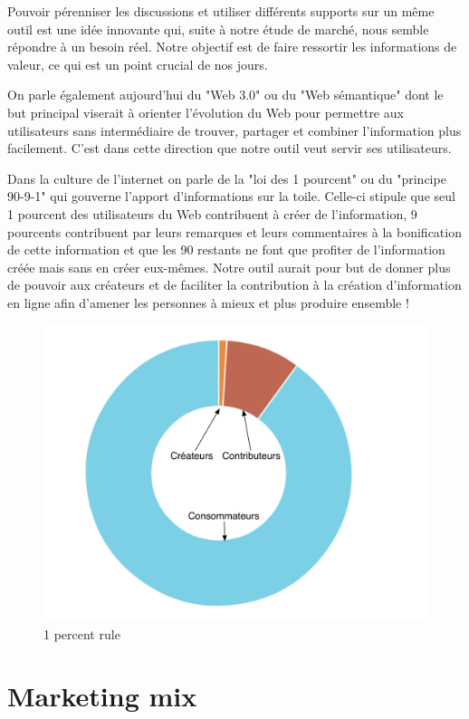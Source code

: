 \documentclass[10pt,twocolumn,a4paper,utf8x]{article}
\begin{document}
Pouvoir pérenniser les discussions et utiliser différents supports sur
un même outil est une idée innovante qui, suite à notre étude de marché,
nous semble répondre à un besoin réel. Notre objectif est de faire
ressortir les informations de valeur, ce qui est un point crucial de nos
jours.

On parle également aujourd'hui du "Web 3.0" ou du "Web sémantique"
dont le but principal viserait à orienter l'évolution du Web pour
permettre aux utilisateurs sans intermédiaire de trouver, partager et
combiner l'information plus facilement. C'est dans cette direction que
notre outil veut servir ses utilisateurs.

Dans la culture de l'internet on parle de la "loi des 1 pourcent" ou
du "principe 90-9-1" qui gouverne l'apport d'informations sur la
toile. Celle-ci stipule que seul 1 pourcent des utilisateurs du Web
contribuent à créer de l'information, 9 pourcents contribuent par leurs
remarques et leurs commentaires à la bonification de cette information
et que les 90 restants ne font que profiter de l'information créée mais
sans en créer eux-mêmes. Notre outil aurait pour but de donner plus de
pouvoir aux créateurs et de faciliter la contribution à la création
d'information en ligne afin d'amener les personnes à mieux et plus
produire ensemble !

\begin{figure}[htbp]
\centering
\includegraphics[width=\hsize]{1PercentRule.png}
\caption{1 percent rule}
\end{figure}

\section{Marketing mix}
\end{document}
